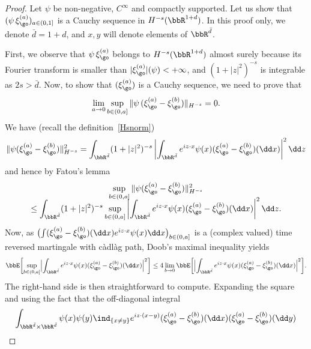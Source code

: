 \begin{proof}
Let $\psi$ be non-negative, $C^{\infty}$ and compactly supported. Let us show that $(\psi\, \xi_{\go}^{(a)})_{a\in(0,1]}$ is a Cauchy sequence in $H^{-s}(\bbR^{1+d})$.
In this proof only, we denote $\bar d = 1+d$, and $x,y$ will denote elements of $\bbR^{\bar d}$.

First, we observe that $\psi\, \xi_{\go}^{(a)}$ belongs to $H^{-s}(\bbR^{1+ d})$ almost surely because its Fourier transform is smaller than $|\xi_{\go}^{(a)}| (\psi) <+\infty$,
and $(1+|z|^2)^{-s}$ is integrable as $2s>\bar d$.
Now, to show that $(\xi_{\go}^{(a)})$ is a Cauchy sequence, we need to prove that
\[
\lim_{a\to 0} \sup_{b\in(0,a]}\|\psi\, (\xi_{\go}^{(a)}-\xi_{\go}^{(b)}) \|_{H^{-s}}=0.
\]
We have (recall the definition~\eqref{Hsnorm})
\begin{equation*}
\|\psi (\xi_{\go}^{(a)}-\xi_{\go}^{(b)}) \|^2_{H^{-s}}
=\int_{\bbR^{\bar d}} (1+|z|^2)^{-s} \left|\int_{\bbR^{\bar d}} e^{i z\cdot x} \psi(x)(\xi_{\go}^{(a)}-\xi_{\go}^{(b)})(\dd x)\right|^2 \dd z
\end{equation*}
and hence by Fatou's lemma\vspace*{-5pt}
\begin{multline}\label{lefatoux}
\sup_{b\in(0,a]}\|\psi(\xi_{\go}^{(a)}-\xi_{\go}^{(b)})\|^2_{H^{-s}}\\[-8pt]
\le \int_{\bbR^{\bar d}} (1+|z|^2)^{-s} \sup_{b\in (0,a]} \left|\int_{\bbR^{\bar d}} e^{i z\cdot x} \psi(x)(\xi_{\go}^{(a)}-\xi_{\go}^{(b)})(\dd x) \right|^2 \dd z.
\end{multline}
Now, as $\bigl(\int(\xi_{\go}^{(a)}-\xi_{\go}^{(b)})(\dd x) e^{i z \cdot x} \psi(x) \dd x \bigr)_{b\in(0,a]}$
is a (complex valued) time reversed martingale with càdlàg path, Doob's maximal inequality yields
\begin{equation*}
\bbE \biggl[ \sup_{b\in(0,a]} \Bigl|\int_{\bbR^{\bar d}} e^{i z \cdot x}\psi(x)(\xi_{\go}^{(a)}-\xi_{\go}^{(b)})(\dd x) \Bigr |^2 \biggr]
\le 4 \lim_{b\to 0}\bbE \biggl[ \Bigl |\int_{\bbR^{\bar d}} e^{i z \cdot x}\psi(x)(\xi_{\go}^{(a)}-\xi_{\go}^{(b)})(\dd x) \Bigr|^2 \biggr].
\end{equation*}
The right-hand side is then straightforward to compute.
Expanding the square and using the fact that the off-diagonal integral
\begin{equation*}
\int_{\bbR^{\bar d} \times \bbR^{\bar d}} \psi(x) \psi(y) \ind_{\{x\ne y\}}e^{i z \cdot (x-y)}(\xi_{\go}^{(a)}-\xi_{\go}^{(b)})(\dd x) (\xi_{\go}^{(a)}-\xi_{\go}^{(b)})(\dd y)
\end{equation*}

\end{proof}
